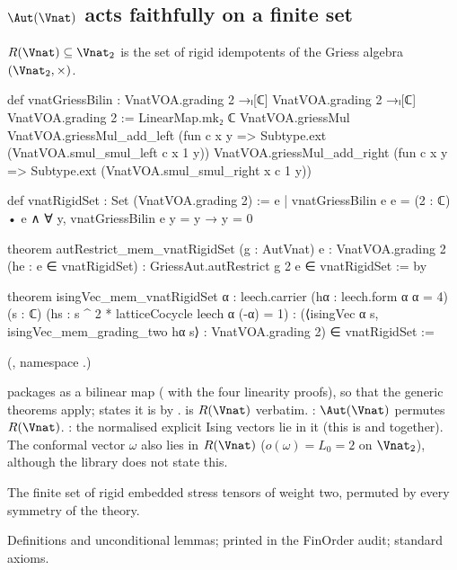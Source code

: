 \subsection{\texorpdfstring{$\Aut(\Vnat)$}{Aut(V)} acts faithfully on a finite set}

\begin{definition}\label{ch20:def:rigidset}
$R(\Vnat)\subseteq\Vnat_2$ is the set of rigid idempotents of the Griess algebra $(\Vnat_2,\times)$.
\end{definition}
\begin{leancode}
def vnatGriessBilin :
    VnatVOA.grading 2 →ₗ[ℂ] VnatVOA.grading 2 →ₗ[ℂ] VnatVOA.grading 2 :=
  LinearMap.mk₂ ℂ VnatVOA.griessMul VnatVOA.griessMul_add_left
    (fun c x y => Subtype.ext (VnatVOA.smul_smul_left c x 1 y))
    VnatVOA.griessMul_add_right
    (fun c x y => Subtype.ext (VnatVOA.smul_smul_right x c 1 y))

def vnatRigidSet : Set (VnatVOA.grading 2) :=
  {e | vnatGriessBilin e e = (2 : ℂ) • e ∧ ∀ y, vnatGriessBilin e y = y → y = 0}

theorem autRestrict_mem_vnatRigidSet (g : AutVnat) {e : VnatVOA.grading 2}
    (he : e ∈ vnatRigidSet) : GriessAut.autRestrict g 2 e ∈ vnatRigidSet := by

theorem isingVec_mem_vnatRigidSet {α : leech.carrier} (hα : leech.form α α = 4) (s : ℂ)
    (hs : s ^ 2 * latticeCocycle leech α (-α) = 1) :
    (⟨isingVec α s, isingVec_mem_grading_two hα s⟩ : VnatVOA.grading 2) ∈ vnatRigidSet :=
\end{leancode}
(, namespace .)
\begin{dictionary}
 packages  as a bilinear map ( with the four linearity proofs),
so that the generic theorems apply;  states it is  by .
 is $R(\Vnat)$ verbatim.  : $\Aut(\Vnat)$ permutes $R(\Vnat)$.
: the normalised explicit Ising vectors lie in it (this is
 and  together).  The conformal vector $\omega$ also lies in $R(\Vnat)$
($o(\omega)=L_0=2$ on $\Vnat_2$), although the library does not state this.
\end{dictionary}
\begin{physics}
The finite set of rigid embedded stress tensors of weight two, permuted by every symmetry of the theory.
\end{physics}
\begin{status}
Definitions and unconditional lemmas; printed in the FinOrder audit; standard axioms.
\end{status}

